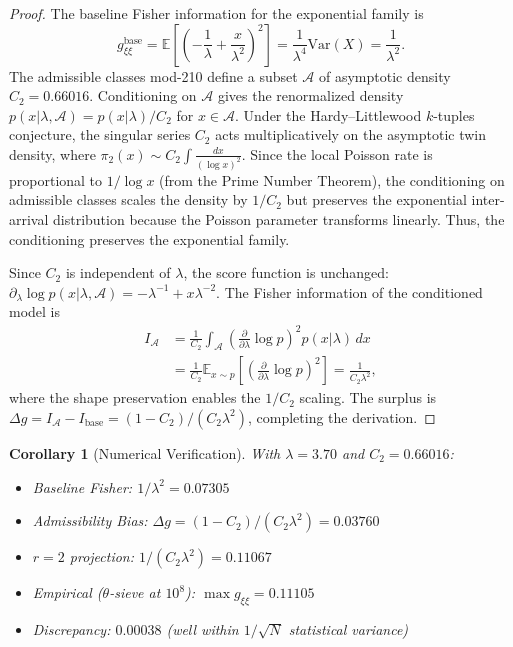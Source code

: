 \documentclass[12pt]{article}
\newtheorem{corollary}[theorem]{Corollary}
\begin{document}
\begin{proof}
The baseline Fisher information for the exponential family is
\[
  g_{\xi\xi}^{\text{base}} = \mathbb{E}\!\left[\left(-\frac{1}{\lambda} + \frac{x}{\lambda^2}\right)^2\right]
  = \frac{1}{\lambda^4}\text{Var}(X) = \frac{1}{\lambda^2}.
\]
The admissible classes mod-210 define a subset $\mathcal{A}$ of asymptotic density
$C_2 = 0.66016$. Conditioning on $\mathcal{A}$ gives the renormalized density
$p(x|\lambda,\mathcal{A}) = p(x|\lambda)/C_2$ for $x \in \mathcal{A}$. Under the Hardy--Littlewood $k$-tuples conjecture, the singular series $C_2$
acts multiplicatively on the asymptotic twin density, where $\pi_2(x) \sim C_2 \int
\frac{dx}{(\log x)^2}$. Since the local Poisson rate is proportional to $1/\log x$
(from the Prime Number Theorem), the conditioning on admissible classes scales the
density by $1/C_2$ but preserves the exponential inter-arrival distribution because
the Poisson parameter transforms linearly. Thus, the conditioning preserves the
exponential family.

Since $C_2$ is independent of $\lambda$, the score function is unchanged:
$\partial_\lambda \log p(x|\lambda,\mathcal{A}) = -\lambda^{-1} + x\lambda^{-2}$.
The Fisher information of the conditioned model is
\begin{align*}
  I_{\mathcal{A}} &= \frac{1}{C_2} \int_{\mathcal{A}}
    \left(\frac{\partial}{\partial\lambda}\log p\right)^2 p(x|\lambda)\,dx \\
  &= \frac{1}{C_2} \mathbb{E}_{x \sim p}\!\left[\left(\frac{\partial}{\partial\lambda}
    \log p\right)^2\right] = \frac{1}{C_2\lambda^2},
\end{align*}
where the shape preservation enables the $1/C_2$ scaling. The surplus is
$\Delta g = I_{\mathcal{A}} - I_{\text{base}} = (1-C_2)/(C_2\lambda^2)$,
completing the derivation.
\end{proof}

\begin{corollary}[Numerical Verification]
With $\lambda = 3.70$ and $C_2 = 0.66016$:
\begin{itemize}
  \item Baseline Fisher: $1/\lambda^2 = 0.07305$
  \item Admissibility Bias: $\Delta g = (1-C_2)/(C_2\lambda^2) = 0.03760$
  \item $r=2$ projection: $1/(C_2\lambda^2) = 0.11067$
  \item Empirical ($\theta$-sieve at $10^8$): $\max g_{\xi\xi} = 0.11105$
  \item Discrepancy: $0.00038$ (well within $1/\sqrt{N}$ statistical variance)
\end{itemize}
\end{corollary}
\end{document}
